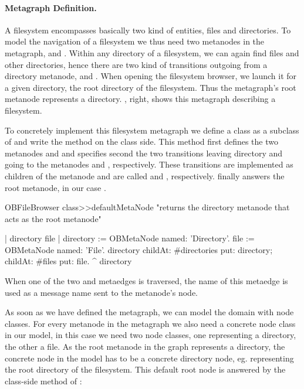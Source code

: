 \documentclass[a4paper,10pt,twoside]{book}
\begin{document}
\paragraph{Metagraph Definition.} 
A filesystem encompasses basically two kind of entities, files and directories. To model the navigation of a filesystem we thus need two metanodes in the metagraph,  and . Within any directory of a filesystem, we can again find files and other directories, hence there are two kind of transitions outgoing from a directory metanode,  and . When opening the filesystem browser, we launch it for a given directory, \eg the root directory of the filesystem. Thus the metagraph's root metanode represents a directory. , right, shows this metagraph describing a filesystem.

To concretely implement this filesystem metagraph we define a class  as a subclass of  and write the method  on the class side. This method first defines the two metanodes   and  and specifies second the two transitions leaving directory and going to the metanodes  and , respectively. These transitions are implemented as children of the metanode  and are called  and , respectively.  finally answers the root metanode, in our case .

\begin{code}{}
OBFileBrowser class>>defaultMetaNode
     "returns the directory metanode that acts as the root metanode"
 
     | directory file |
     directory := OBMetaNode named: 'Directory'.
     file := OBMetaNode named: 'File'.
     directory 
          childAt: #directories put: directory;
          childAt: #files put: file.
     ^ directory
\end{code}

When one of the two  and  metaedges is traversed, the name of this metaedge is used as a message name sent to the metanode's node.

As soon as we have defined the metagraph, we can model the domain with node classes. For every metanode in the metagraph we also need a concrete node class in our model, in this case we need two node classes, one representing a directory, the other a file. As the root metanode in the graph represents a directory, the concrete node in the model has to be a concrete directory node, eg. representing the root directory of the filesystem. This default root node is answered by the class-side method  of : 
                    
\end{document}
